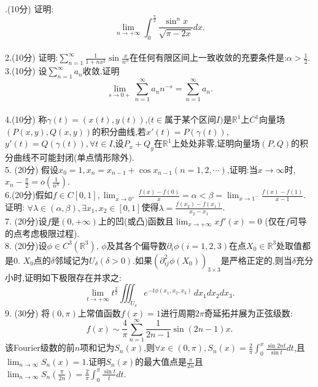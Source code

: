 \documentclass[b5paper]{ctexart}
\begin{document}
\pagestyle{plain}
.(10分) 证明:$$\lim_{n \to +\infty }\int_{0}^{\frac{\pi }{2}}\frac{\sin ^nx}{\sqrt{\pi -2x}}dx.$$\\
2.(10分) 证明:$\sum_{n=1}^{\infty }\frac{1}{1+nx^2}\sin \frac{x}{n^\alpha }$在任何有限区间上一致收敛的充要条件是:$\alpha > \frac{1}{2}$.\\
3.(10分) 设$\sum_{n=1}^{\infty }a_n$收敛.证明$$\lim_{s\rightarrow 0+}\sum_{n=1}^{\infty }a_nn^{-s}=\sum_{n=1}^{\infty }a_n.$$\\
4.(10分) 称$\gamma (t)=(x(t),y(t))$,$(t\in $属于某个区间$I)$是$\mathbb{R}^1$上$C^1$向量场$(P(x,y),Q(x,y))$的积分曲线,若${x}'(t)=P(\gamma (t))$,${y}'(t)=Q(\gamma (t)),\forall t\in I$,设$P_x+Q_y$在$\mathbb{R}^1$上处处非零,证明向量场$(P,Q)$的积分曲线不可能封闭(单点情形除外).\\
5. (20分) 假设$\displaystyle x_0=1,x_n=x_{n-1}+\cos x_{n-1}(n=1,2,\cdots )$,证明:当$x\rightarrow \infty $时, $\displaystyle x_n-\frac{\pi }{2}=o\left(\frac{1}{n^n}\right)$.\\
6.(20分)假如$\displaystyle f\in C[0,1],\lim_{x\to 0^+}\frac{f(x)-f(0)}x=\alpha<\beta=\lim_{x\to 1^-}\frac{f(x)-f(1)}{x-1}$.证明: $\forall \lambda\in (\alpha,\beta),\exists x_1,x_2\in [0,1]$使得$\displaystyle \lambda=\frac{f(x_2)-f(x_1)}{x_2-x_1}$.\\
7. (20分)设$f$是$(0,+\infty)$上的凹(或凸)函数且$\displaystyle \lim_{x\to+\infty}xf'(x)=0$ (仅在$f$可导的点考虑极限过程).\\
8. (20分)设$\phi\in C^3(\mathbb{R}^3)$, $\phi$及其各个偏导数$\partial_i\phi(i=1,2,3)$在点$X_0\in \mathbb{R}^3$处取值都是$0$. $X_0$点的$\delta$邻域记为$U_\delta(\delta>0)$.如果$\left(\partial_{ij}^2\phi(X_0)\right)_{3\times 3}$是严格正定的,则当$\delta$充分小时,证明如下极限存在并求之:
\[\mathop {\lim }\limits_{t \to + \infty } t^{\frac{3}{2}}\iiint_{{U _\delta }} {{e^{ - t\phi\left( {x_1,x_2,x_3} \right)}}\,dx_1dx_2dx_3} .\]
9. (30分) 将$(0,\pi)$上常值函数$f(x)=1$进行周期$2\pi$奇延拓并展为正弦级数:\[f(x)\sim \frac4\pi\sum_{n=1}^\infty \frac1{2n-1}\sin (2n-1)x.\]
该Fourier级数的前$n$项和记为$S_n(x)$,则$\displaystyle \forall x\in (0,\pi),S_n(x)=\frac2\pi\int_0^x\frac{\sin 2nt}{\sin t}dt$,且$\displaystyle \lim_{n\to\infty}S_n(x)=1$.证明$S_n(x)$的最大值点是$\displaystyle \frac\pi{2n}$且$\displaystyle\lim_{n\to\infty}S_n\left(\frac\pi{2n}\right)=\frac 2\pi \int_0^\pi\frac{\sin t}t dt$.
\end{document}
